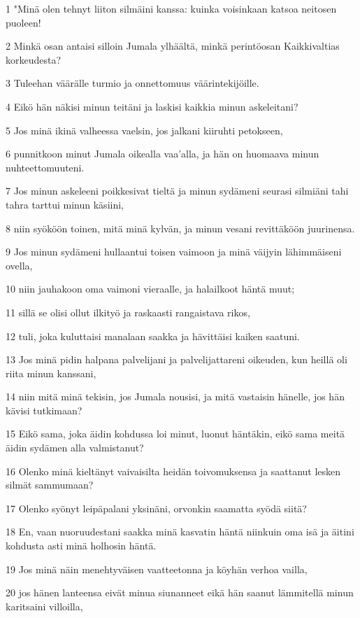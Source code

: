 \par 1 "Minä olen tehnyt liiton silmäini kanssa: kuinka voisinkaan katsoa neitosen puoleen!
\par 2 Minkä osan antaisi silloin Jumala ylhäältä, minkä perintöosan Kaikkivaltias korkeudesta?
\par 3 Tuleehan väärälle turmio ja onnettomuus väärintekijöille.
\par 4 Eikö hän näkisi minun teitäni ja laskisi kaikkia minun askeleitani?
\par 5 Jos minä ikinä valheessa vaelsin, jos jalkani kiiruhti petokseen,
\par 6 punnitkoon minut Jumala oikealla vaa'alla, ja hän on huomaava minun nuhteettomuuteni.
\par 7 Jos minun askeleeni poikkesivat tieltä ja minun sydämeni seurasi silmiäni tahi tahra tarttui minun käsiini,
\par 8 niin syököön toinen, mitä minä kylvän, ja minun vesani revittäköön juurinensa.
\par 9 Jos minun sydämeni hullaantui toisen vaimoon ja minä väijyin lähimmäiseni ovella,
\par 10 niin jauhakoon oma vaimoni vieraalle, ja halailkoot häntä muut;
\par 11 sillä se olisi ollut ilkityö ja raskaasti rangaistava rikos,
\par 12 tuli, joka kuluttaisi manalaan saakka ja hävittäisi kaiken saatuni.
\par 13 Jos minä pidin halpana palvelijani ja palvelijattareni oikeuden, kun heillä oli riita minun kanssani,
\par 14 niin mitä minä tekisin, jos Jumala nousisi, ja mitä vastaisin hänelle, jos hän kävisi tutkimaan?
\par 15 Eikö sama, joka äidin kohdussa loi minut, luonut häntäkin, eikö sama meitä äidin sydämen alla valmistanut?
\par 16 Olenko minä kieltänyt vaivaisilta heidän toivomuksensa ja saattanut lesken silmät sammumaan?
\par 17 Olenko syönyt leipäpalani yksinäni, orvonkin saamatta syödä siitä?
\par 18 En, vaan nuoruudestani saakka minä kasvatin häntä niinkuin oma isä ja äitini kohdusta asti minä holhosin häntä.
\par 19 Jos minä näin menehtyväisen vaatteetonna ja köyhän verhoa vailla,
\par 20 jos hänen lanteensa eivät minua siunanneet eikä hän saanut lämmitellä minun karitsaini villoilla,
